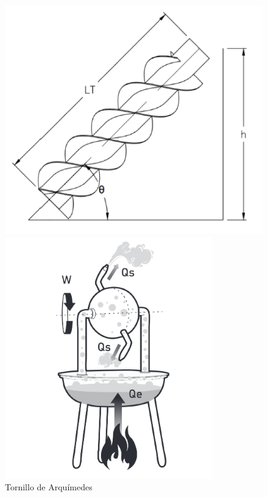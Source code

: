 \begin{figure}[ht!]
	\centering
	\begin{minipage}{0.3\linewidth}
		\centering
		\includegraphics[width=\linewidth]{figs/arquimedes.png}
		\caption*{\centering Tornillo de Arquímedes}  %
	\end{minipage}
	\hspace{3cm}
	\begin{minipage}{0.3\linewidth}
		\centering
		\includegraphics[width=\linewidth]{figs/eolipila.png}

\end{minipage}
\end{figure}
